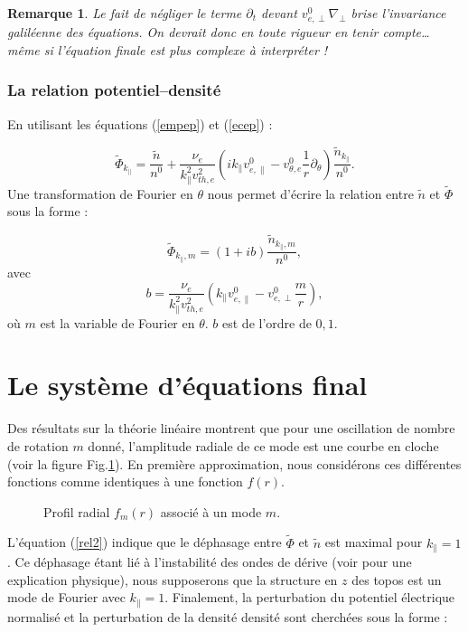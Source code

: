 \documentclass{book}
\newtheorem{rem}{Remarque}[chapter]
\begin{document}
\begin{rem}
Le fait de n\'egliger le terme $\partial_t$ devant
$v^0_{e,\perp}\nabla_\perp$ brise l'invariance galil\'eenne des
\'equations. On devrait donc en toute rigueur en tenir compte\dots
m\^eme si 
l'\'equation finale est plus complexe \`a interpr\'eter !
\end{rem}

\subsubsection{La relation potentiel--densit\'e}

En utilisant les \'equations (\ref{empep}) et (\ref{ecep}) :

\begin{equation}
\tilde\Phi_{k_\parallel}=\frac{\tilde n}{n^0}
+\frac{\nu_e}{k_\parallel^2 v_{th,e}^2}
(i k_\parallel v^0_{e,\parallel}-v^0_{\theta,e}\frac{1}{r}\partial_\theta)
\frac{\tilde n_{k_\parallel}}{n^0}.
\end{equation}
Une transformation de Fourier en $\theta$ nous permet d'\'ecrire la
relation entre $\tilde n$ et $\tilde \Phi$ sous la forme :

\begin{equation}\label{rel2}
\tilde\Phi_{k_\parallel,m}=(1+i b)\frac{\tilde n_{k_\parallel,m}}{n^0},
\end{equation}
avec
\begin{equation}
b=\frac{\nu_e}{k_\parallel^2 v_{th,e}^2}
(k_\parallel v^0_{e,\parallel}-v^0_{e,\perp}\frac{m}{r}),
\end{equation}
o\`u $m$ est la variable de Fourier en $\theta$. $b$ est de l'ordre de
$0,1$. 

\section{Le syst\`eme d'\'equations final}\label{systfinal}
Des r\'esultats \cite{Ellis80,Marden80}  sur la th\'eorie lin\'eaire
montrent 
que pour une oscillation de nombre de rotation $m$ donn\'e,
l'amplitude radiale de ce mode est une courbe en cloche (voir la
figure Fig.\ref{figmoderad}).
En premi\`ere approximation, nous consid\'erons ces diff\'erentes
fonctions comme identiques \`a une fonction $f(r)$.
\begin{figure}[htb]
 \centerline{}   
 \caption{Profil radial $f_m(r)$ associ\'e \`a un mode $m$.}
 \label{figmoderad}
\end{figure}
%
L'\'equation (\ref{rel2}) indique que le d\'ephasage entre
$\tilde\Phi$ et $\tilde n$ est maximal pour $k_\parallel=1$. Ce
d\'ephasage \'etant li\'e \`a l'instabilit\'e des ondes de d\'erive
(voir \cite{Chen84} pour une explication physique), nous supposerons
que la structure en $z$ des topos est un mode de Fourier avec
$k_\parallel=1$.
Finalement, la perturbation du potentiel \'electrique normalis\'e  et
la perturbation de la 
densit\'e densit\'e sont cherch\'ees
sous la forme :
\end{document}
